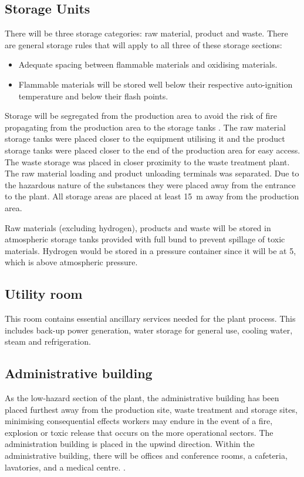 \subsection{Storage Units}

There will be three storage categories: raw material, product and waste. There are general storage rules that will apply to all three of these storage sections: 

\begin{itemize}
    \item Adequate spacing between flammable materials and oxidising materials.
    \item Flammable materials will be stored well below their respective auto-ignition temperature and below their flash points.
\end{itemize}

Storage will be segregated from the production area to avoid the risk of fire propagating from the production area to the storage tanks \cite{mannan_lees_2012}. The raw material storage tanks were placed closer to the equipment utilising it and the product storage tanks were placed closer to the end of the production area for easy access. The waste storage was placed in closer proximity to the waste treatment plant. The raw material loading and product unloading terminals was separated. Due to the hazardous nature of the substances they were placed away from the entrance to the plant. All storage areas are placed at least \SI{15}{\m} away from the production area. 

Raw materials (excluding hydrogen), products and waste will be stored in atmospheric storage tanks provided with full bund to prevent spillage of toxic materials. Hydrogen would be stored in a pressure container since it will be at \SI{5}{\atm}, which is above atmospheric pressure.


\subsection{Utility room}
This room contains essential ancillary services needed for the plant process. This includes back-up power generation, water storage for general use, cooling water, steam and refrigeration. 

\subsection{Administrative building}

As the low-hazard section of the plant, the administrative building has been placed furthest away from the production site, waste treatment and storage sites, minimising consequential effects workers may endure in the event of a fire, explosion or toxic release that occurs on the more operational sectors. The administration building is placed in the upwind direction. Within the administrative building, there will be offices and conference rooms, a cafeteria, lavatories, and a medical centre. \cite{sinnott_coulson_2005}. 

